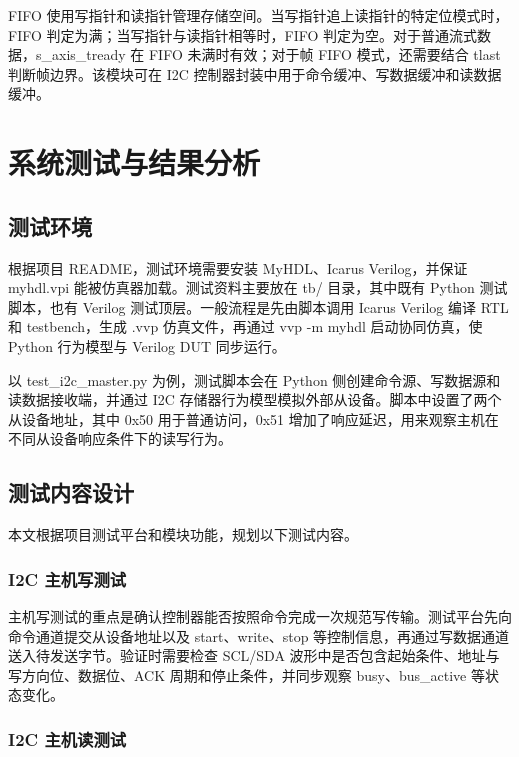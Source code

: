 \documentclass[12pt,a4paper]{article}
\numberwithin{equation}{section}
\begin{document}
FIFO
使用写指针和读指针管理存储空间。当写指针追上读指针的特定位模式时，FIFO
判定为满；当写指针与读指针相等时，FIFO
判定为空。对于普通流式数据，s\_axis\_tready 在
FIFO 未满时有效；对于帧 FIFO 模式，还需要结合
tlast 判断帧边界。该模块可在 I2C
控制器封装中用于命令缓冲、写数据缓冲和读数据缓冲。

\section{系统测试与结果分析}\label{ux7cfbux7edfux6d4bux8bd5ux4e0eux7ed3ux679cux5206ux6790}

\subsection{测试环境}\label{ux6d4bux8bd5ux73afux5883}

根据项目 README，测试环境需要安装 MyHDL、Icarus Verilog，并保证
myhdl.vpi 能被仿真器加载。测试资料主要放在
tb/ 目录，其中既有 Python 测试脚本，也有
Verilog 测试顶层。一般流程是先由脚本调用 Icarus Verilog 编译 RTL 和
testbench，生成 .vvp 仿真文件，再通过
vvp -m myhdl 启动协同仿真，使 Python
行为模型与 Verilog DUT 同步运行。

以 test\_i2c\_master.py 为例，测试脚本会在
Python 侧创建命令源、写数据源和读数据接收端，并通过 I2C
存储器行为模型模拟外部从设备。脚本中设置了两个从设备地址，其中
0x50
用于普通访问，0x51
增加了响应延迟，用来观察主机在不同从设备响应条件下的读写行为。

\subsection{测试内容设计}\label{ux6d4bux8bd5ux5185ux5bb9ux8bbeux8ba1}

本文根据项目测试平台和模块功能，规划以下测试内容。

\subsubsection{I2C
主机写测试}\label{i2c-ux4e3bux673aux5199ux6d4bux8bd5}

主机写测试的重点是确认控制器能否按照命令完成一次规范写传输。测试平台先向命令通道提交从设备地址以及
start、write、stop
等控制信息，再通过写数据通道送入待发送字节。验证时需要检查 SCL/SDA
波形中是否包含起始条件、地址与写方向位、数据位、ACK
周期和停止条件，并同步观察
busy、bus\_active
等状态变化。

\subsubsection{I2C
主机读测试}\label{i2c-ux4e3bux673aux8bfbux6d4bux8bd5}
\end{document}

